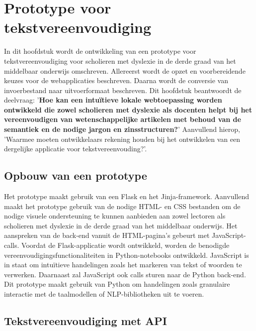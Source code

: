 \chapter{Prototype voor tekstvereenvoudiging}

In dit hoofdstuk wordt de ontwikkeling van een prototype voor tekstvereenvoudiging voor scholieren met dyslexie in de derde graad van het middelbaar onderwijs omschreven. Allereerst wordt de opzet en voorbereidende keuzes voor de webapplicaties beschreven. Daarna wordt de conversie van invoerbestand naar uitvoerformaat beschreven. Dit hoofdstuk beantwoordt de deelvraag: '\textbf{Hoe kan een intuïtieve lokale webtoepassing worden ontwikkeld die zowel scholieren met dyslexie als docenten helpt bij het vereenvoudigen van wetenschappelijke artikelen met behoud van de semantiek en de nodige jargon en zinsstructuren?}' Aanvullend hierop, 'Waarmee moeten ontwikkelaars rekening houden bij het ontwikkelen van een dergelijke applicatie voor tekstvereenvouding?'.

\section{Opbouw van een prototype}

Het prototype maakt gebruik van een Flask en het Jinja-framework. Aanvullend maakt het prototype gebruik van de nodige HTML- en CSS bestanden om de nodige visuele ondersteuning te kunnen aanbieden aan zowel lectoren als scholieren met dyslexie in de derde graad van het middelbaar onderwijs. Het aanspreken van de back-end vanuit de HTML-pagina's gebeurt met JavaScript-calls. Voordat de Flask-applicatie wordt ontwikkeld, worden de benodigde vereenvoudigingsfunctionaliteiten in Python-notebooks ontwikkeld. JavaScript is in staat om intuïtieve handelingen zoals het markeren van tekst of woorden te verwerken. Daarnaast zal JavaScript ook calls sturen naar de Python back-end. Dit prototype maakt gebruik van Python om handelingen zoals granulaire interactie met de taalmodellen of NLP-bibliotheken uit te voeren. 

\section{Tekstvereenvoudiging met API}

